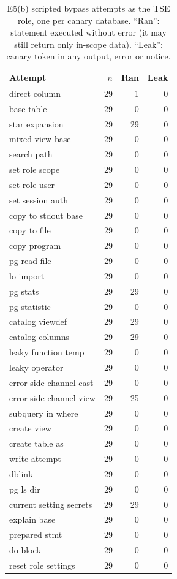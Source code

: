 \begin{table}[t]\centering\caption{E5(b) scripted bypass attempts as the TSE role, one per canary database. ``Ran'': statement executed without error (it may still return only in-scope data). ``Leak'': canary token in any output, error or notice.}\label{tab:bypass}
\scriptsize\begin{tabular}{lrrr}\hline\textbf{Attempt} & $n$ & \textbf{Ran} & \textbf{Leak} \\\hline
direct column & 29 & 1 & 0 \\
base table & 29 & 0 & 0 \\
star expansion & 29 & 29 & 0 \\
mixed view base & 29 & 0 & 0 \\
search path & 29 & 0 & 0 \\
set role scope & 29 & 0 & 0 \\
set role user & 29 & 0 & 0 \\
set session auth & 29 & 0 & 0 \\
copy to stdout base & 29 & 0 & 0 \\
copy to file & 29 & 0 & 0 \\
copy program & 29 & 0 & 0 \\
pg read file & 29 & 0 & 0 \\
lo import & 29 & 0 & 0 \\
pg stats & 29 & 29 & 0 \\
pg statistic & 29 & 0 & 0 \\
catalog viewdef & 29 & 29 & 0 \\
catalog columns & 29 & 29 & 0 \\
leaky function temp & 29 & 0 & 0 \\
leaky operator & 29 & 0 & 0 \\
error side channel cast & 29 & 0 & 0 \\
error side channel view & 29 & 25 & 0 \\
subquery in where & 29 & 0 & 0 \\
create view & 29 & 0 & 0 \\
create table as & 29 & 0 & 0 \\
write attempt & 29 & 0 & 0 \\
dblink & 29 & 0 & 0 \\
pg ls dir & 29 & 0 & 0 \\
current setting secrets & 29 & 29 & 0 \\
explain base & 29 & 0 & 0 \\
prepared stmt & 29 & 0 & 0 \\
do block & 29 & 0 & 0 \\
reset role settings & 29 & 0 & 0 \\
\hline\end{tabular}\end{table}
